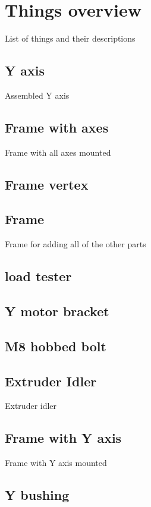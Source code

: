 \documentclass[11pt]{article}
\begin{document}
\section{Things overview}
List of things and their descriptions
\subsection{Y axis}
Assembled Y axis

\subsection{Frame with axes}
Frame with all axes mounted

\subsection{Frame vertex}

\subsection{Frame}
Frame for adding all of the other parts

\subsection{load tester}

\subsection{Y motor bracket}

\subsection{M8 hobbed bolt}

\subsection{Extruder Idler}
Extruder idler

\subsection{Frame with Y axis}
Frame with Y axis mounted

\subsection{Y bushing}
\end{document}

